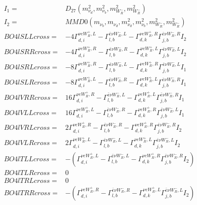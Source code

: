 \documentclass[A4,landscape]{article}
\begin{document}
\begin{align} 
I_1 = & D_{27}(m^2_{\nu_{{d}}}, m^2_{\nu_{{b}}}, m^2_{W_R^-}, m^2_{W_R^-}) \\ 
I_2 = & MMD0(m_{\nu_{{b}}}, m_{\nu_{{d}}}, m^2_{\nu_{{d}}}, m^2_{\nu_{{b}}}, m^2_{W_R^-}, m^2_{W_R^-}) \\ 
  BO4lSLLcross= & -4  \Gamma^{\nu e W_R^+,L}_{d, i} - \Gamma^{\bar{e}\nu W_R^- ,L} _{l, b} - \Gamma^{\nu e W_R^+,R} _{d, k} \Gamma^{\bar{e}\nu W_R^- ,R}_{j, b} I_2 \\ 
  BO4lSRRcross= & -4  \Gamma^{\nu e W_R^+,R}_{d, i} - \Gamma^{\bar{e}\nu W_R^- ,R} _{l, b} - \Gamma^{\nu e W_R^+,L} _{d, k} \Gamma^{\bar{e}\nu W_R^- ,L}_{j, b} I_2 \\ 
  BO4lSRLcross= & -8  \Gamma^{\nu e W_R^+,R}_{d, i} - \Gamma^{\bar{e}\nu W_R^- ,L} _{l, b} - \Gamma^{\nu e W_R^+,R} _{d, k} \Gamma^{\bar{e}\nu W_R^- ,L}_{j, b} I_1 \\ 
  BO4lSLRcross= & -8  \Gamma^{\nu e W_R^+,L}_{d, i} - \Gamma^{\bar{e}\nu W_R^- ,R} _{l, b} - \Gamma^{\nu e W_R^+,L} _{d, k} \Gamma^{\bar{e}\nu W_R^- ,R}_{j, b} I_1 \\ 
  BO4lVRRcross= & 16  \Gamma^{\nu e W_R^+,R}_{d, i} - \Gamma^{\bar{e}\nu W_R^- ,L} _{l, b} - \Gamma^{\nu e W_R^+,L} _{d, k} \Gamma^{\bar{e}\nu W_R^- ,R}_{j, b} I_1 \\ 
  BO4lVLLcross= & 16  \Gamma^{\nu e W_R^+,L}_{d, i} - \Gamma^{\bar{e}\nu W_R^- ,R} _{l, b} - \Gamma^{\nu e W_R^+,R} _{d, k} \Gamma^{\bar{e}\nu W_R^- ,L}_{j, b} I_1 \\ 
  BO4lVRLcross= & 2  \Gamma^{\nu e W_R^+,R}_{d, i} - \Gamma^{\bar{e}\nu W_R^- ,R} _{l, b} - \Gamma^{\nu e W_R^+,R} _{d, k} \Gamma^{\bar{e}\nu W_R^- ,R}_{j, b} I_2 \\ 
  BO4lVLRcross= & 2  \Gamma^{\nu e W_R^+,L}_{d, i} - \Gamma^{\bar{e}\nu W_R^- ,L} _{l, b} - \Gamma^{\nu e W_R^+,L} _{d, k} \Gamma^{\bar{e}\nu W_R^- ,L}_{j, b} I_2 \\ 
  BO4lTLLcross= & -( \Gamma^{\nu e W_R^+,L}_{d, i} - \Gamma^{\bar{e}\nu W_R^- ,L} _{l, b} - \Gamma^{\nu e W_R^+,R} _{d, k} \Gamma^{\bar{e}\nu W_R^- ,R}_{j, b} I_2) \\ 
  BO4lTLRcross= & 0 \\ 
  BO4lTRLcross= & 0 \\ 
  BO4lTRRcross= & -( \Gamma^{\nu e W_R^+,R}_{d, i} - \Gamma^{\bar{e}\nu W_R^- ,R} _{l, b} - \Gamma^{\nu e W_R^+,L} _{d, k} \Gamma^{\bar{e}\nu W_R^- ,L}_{j, b} I_2) \\ 
\end{align} 
\end{document}
